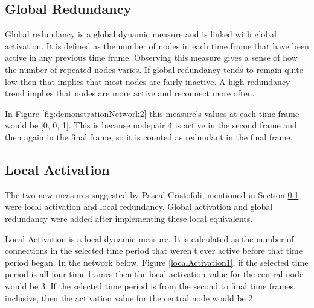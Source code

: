 


\subsection{Global Redundancy}
Global redundancy is a global dynamic measure and is linked with global activation. It is defined as the number of nodes in each time frame that have been active in any previous time frame. Observing this measure gives a sense of how the number of repeated nodes varies. If global redundancy tends to remain quite low then that implies that most nodes are fairly inactive. A high redundancy trend implies that nodes are more active and reconnect more often.

In Figure \ref{fig:demonstrationNetwork2} this measure's values at each time frame would be [0, 0, 1]. This is because nodepair 4 is active in the second frame and then again in the final frame, so it is counted as redundant in the final frame.





\subsection{Local Activation}
\label{localActivationSection}

The two new measures suggested by Pascal Cristofoli, mentioned in Section \ref{}, were local activation and local redundancy. Global activation and global redundancy were added after implementing these local equivalents.

Local Activation is a local dynamic measure. It is calculated as the number of connections in the selected time period that weren't ever active before that time period began. In the network below, Figure \ref{localActivation1}, if the selected time period is all four time frames then the local activation value for the central node would be 3. If the selected time period is from the second to final time frames, inclusive, then the activation value for the central node would be 2.

